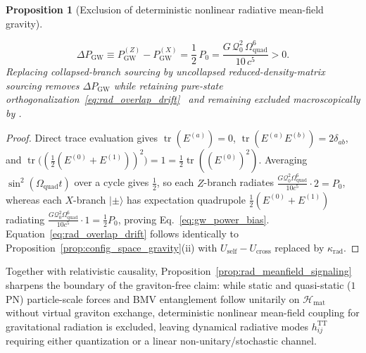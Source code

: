 \documentclass[aps,prd,onecolumn,tightenlines,nofootinbib,notitlepage,11pt,floatfix]{revtex4-2}
\theoremstyle{indentedtheorem}
\newtheorem{proposition}{Proposition}
\begin{document}
\begin{proposition}[Exclusion of deterministic nonlinear radiative mean-field gravity]
\begin{enumerate}[label=(\roman*)]
\begin{equation}
    \Delta P_\text{GW} \equiv P_\text{GW}^{(Z)} - P_\text{GW}^{(X)} = \frac{1}{2}\,P_0 = \frac{G\,\mathcal{Q}_0^2\,\Omega_\text{quad}^6}{10\,c^5} > 0 .
    \label{eq:gw_power_bias}
\end{equation}
Replacing collapsed-branch sourcing by uncollapsed reduced-density-matrix sourcing removes $\Delta P_\text{GW}$ while retaining pure-state orthogonalization~\eqref{eq:rad_overlap_drift}~\citep{Polchinski1991} and remaining excluded macroscopically by \citet{PageGeilker1981Indirect}.
\end{enumerate}
\end{proposition}
\begin{proof}
Direct trace evaluation gives $\operatorname{tr}(E^{(a)})=0$, $\operatorname{tr}(E^{(a)}E^{(b)})=2\delta_{ab}$, and $\operatorname{tr}\big((\tfrac{1}{2}(E^{(0)}+E^{(1)}))^2\big)=1=\tfrac{1}{2}\operatorname{tr}((E^{(0)})^2)$. Averaging $\sin^2(\Omega_\text{quad}t)$ over a cycle gives $\tfrac{1}{2}$, so each $Z$-branch radiates $\frac{G\mathcal{Q}_0^2\Omega_\text{quad}^6}{10c^5}\cdot 2 = P_0$, whereas each $X$-branch $|\pm\rangle$ has expectation quadrupole $\tfrac{1}{2}(E^{(0)}+E^{(1)})$ radiating $\frac{G\mathcal{Q}_0^2\Omega_\text{quad}^6}{10c^5}\cdot 1 = \tfrac{1}{2}P_0$, proving Eq.~\eqref{eq:gw_power_bias}. Equation~\eqref{eq:rad_overlap_drift} follows identically to Proposition~\ref{prop:config_space_gravity}(ii) with $U_\text{self}-U_\text{cross}$ replaced by $\kappa_\text{rad}$.
\end{proof}
\noindent Together with relativistic causality, Proposition~\ref{prop:rad_meanfield_signaling} sharpens the boundary of the graviton-free claim: while static and quasi-static ($1$PN) particle-scale forces and BMV entanglement follow unitarily on $\mathcal{H}_\text{mat}$ without virtual graviton exchange, deterministic nonlinear mean-field coupling for gravitational radiation is excluded, leaving dynamical radiative modes $h_{ij}^\text{TT}$ requiring either quantization or a linear non-unitary/stochastic channel.
\end{document}
